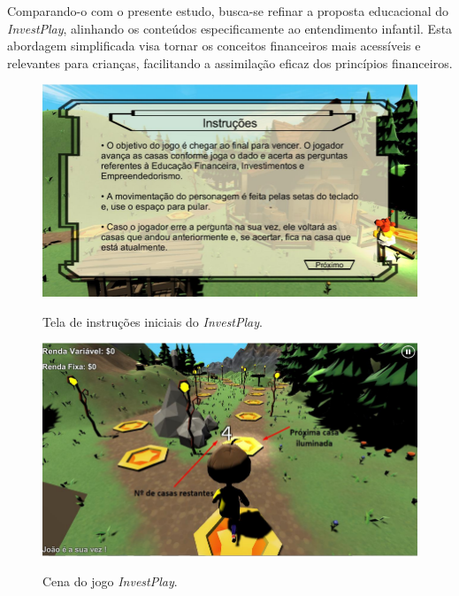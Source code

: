 Comparando-o com o presente estudo, busca-se refinar a proposta educacional do \textit{InvestPlay}, alinhando os conteúdos especificamente ao entendimento infantil. Esta abordagem simplificada visa tornar os conceitos financeiros mais acessíveis e relevantes para crianças, facilitando a assimilação eficaz dos princípios financeiros.

\begin{figure}[ht]
	\centering
	\caption{Tela de instruções iniciais do \textit{InvestPlay}.}
	\includegraphics[scale=0.6]{Textuais/Pictures/invest-play-1.png}
	\label{fig:invest-play-1}
\end{figure}

\begin{figure}[ht]
	\centering
	\caption{Cena do jogo \textit{InvestPlay}.}
	\includegraphics[scale=0.6]{Textuais/Pictures/invest-play-2.png}
	\label{fig:invest-play-2}
\end{figure}

